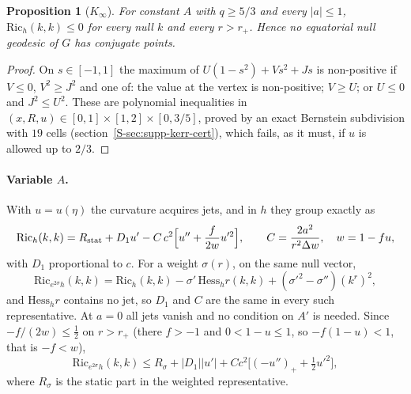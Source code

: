\documentclass[aip,jmp,amsmath,amssymb,reprint]{revtex4-2}
\theoremstyle{plain}
\newtheorem{proposition}{Proposition}[section]
\theoremstyle{definition}
\begin{document}
\begin{proposition}[$K_\infty$]\label{prop:kerr-Kinf}
For constant $A$ with $q\ge5/3$ and every $|a|\le1$, $\mathrm{Ric}_h(k,k)\le0$ for every null $k$ and every
$r>r_+$. Hence no equatorial null geodesic of $G$ has conjugate points.
\end{proposition}

\begin{proof}
On $s\in[-1,1]$ the maximum of $U(1-s^2)+Vs^2+Js$ is non-positive if $V\le0$, $V^2\ge J^2$ and one of:
the value at the vertex is non-positive; $V\ge U$; or $U\le0$ and $J^2\le U^2$. These are polynomial
inequalities in $(x,R,u)\in[0,1]\times[1,2]\times[0,3/5]$, proved by an exact Bernstein subdivision with $19$ cells
(section~\ref{S-sec:supp-kerr-cert}), which fails, as it must, if $u$ is allowed up to $2/3$.
\end{proof}

\paragraph{Variable $A$.} With $u=u(\eta)$ the curvature acquires jets, and in $h$ they group
exactly as
\[
  \mathrm{Ric}_h(k,k)=R_{\rm stat}+D_1u'-C\,c^2\Big[u''+\frac f{2w}u'^2\Big],\qquad
  C=\frac{2a^2}{r^2\Delta w},\quad w=1-fu,
\]
with $D_1$ proportional to $c$. For a weight $\sigma(r)$, on the same null vector,
\[
  \mathrm{Ric}_{e^{2\sigma}h}(k,k)=\mathrm{Ric}_h(k,k)-\sigma'\,\mathrm{Hess}_hr(k,k)+(\sigma'^2-\sigma'')(k^r)^2 ,
\]
and $\mathrm{Hess}_hr$ contains no jet, so $D_1$ and $C$ are the same in every such representative. At
$a=0$ all jets vanish and no condition on $A'$ is needed. Since $-f/(2w)\le\frac12$ on $r>r_+$ (there $f>-1$ and $0<1-u\le1$, so $-f(1-u)<1$, that is $-f<w$),
\[
  \mathrm{Ric}_{e^{2\sigma}h}(k,k)\le R_\sigma+|D_1||u'|+Cc^2\big[(-u'')_++\tfrac12u'^2\big],
\]
where $R_\sigma$ is the static part in the weighted representative.
\end{document}
